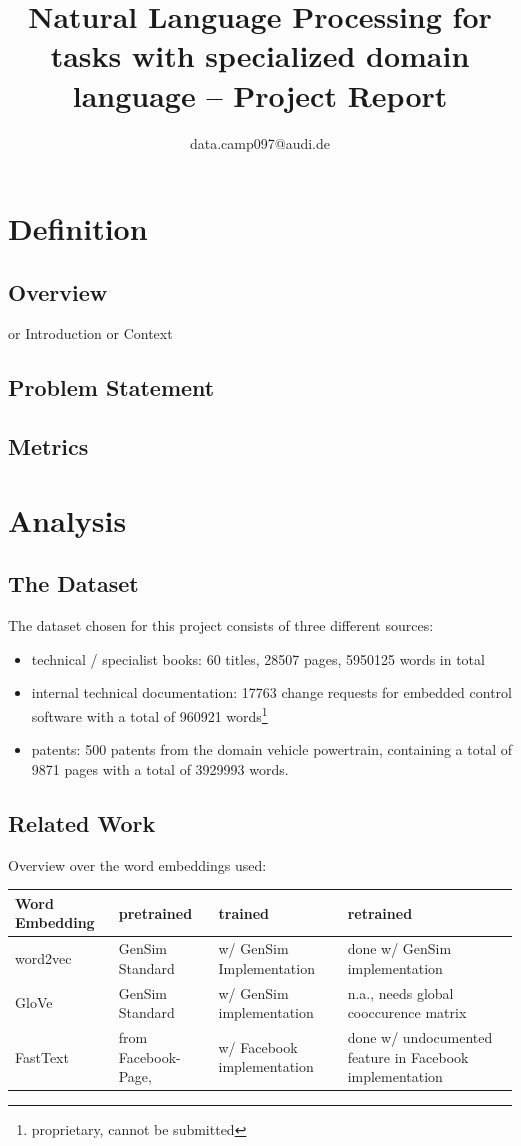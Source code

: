 \documentclass[10pt,a4paper]{article}
\begin{document}
	\title{Natural Language Processing for tasks with specialized domain language  --  Project Report}
	\author{data.camp097@audi.de}
	\maketitle
	
	\section{Definition}
	\subsection{Overview}
	or Introduction or Context
	\subsection{Problem Statement}
	
	\subsection{Metrics}
	\section{Analysis}
	\subsection{The Dataset}
	The dataset chosen for this project consists of three different sources:
		\begin{itemize}
		\item technical / specialist books: 60 titles, 28507 pages, 5950125 words in total 
		\item internal technical documentation: 17763 change requests for embedded control software with a total of 960921 words\footnote{proprietary, cannot be submitted} 
		\item patents: 500 patents from the domain vehicle powertrain, containing a total of 9871 pages with a total of 3929993 words.
	\end{itemize}
	\subsection{Related Work}
	Overview over the word embeddings used:
	\begin{center}
		\begin{tabular}{|l|p{3cm}| p{3cm}| p{3cm}|}
			\hline
			\textbf{Word Embedding} & pretrained & trained & retrained \\ 
			\hline
			word2vec  & GenSim Standard & w/ GenSim Implementation & done w/ GenSim implementation \\  
			\hline
			GloVe & GenSim Standard &w/ GenSim implementation & n.a., needs global cooccurence matrix \\  
			\hline
			FastText & from Facebook-Page,  & w/ Facebook implementation & done w/ undocumented feature in Facebook implementation\\
			\hline
			 	
			
			
		\end{tabular}
	\end{center}
\end{document}
